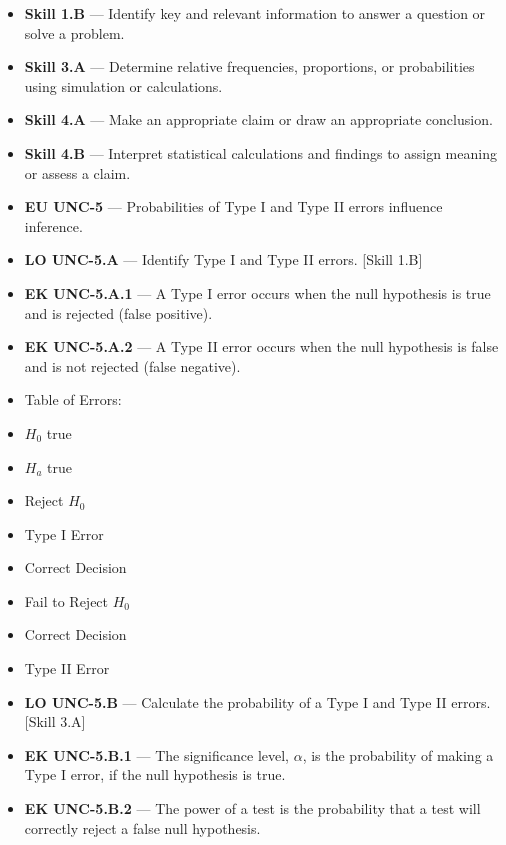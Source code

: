\documentclass[11pt]{article}
\begin{document}


{\small
\begin{itemize}[leftmargin=1.5em,itemsep=2pt,topsep=2pt]
  \item \textbf{Skill 1.B} --- Identify key and relevant information to answer a question or solve a problem.
  \item \textbf{Skill 3.A} --- Determine relative frequencies, proportions, or probabilities using simulation or calculations.
  \item \textbf{Skill 4.A} --- Make an appropriate claim or draw an appropriate conclusion.
  \item \textbf{Skill 4.B} --- Interpret statistical calculations and findings to assign meaning or assess a claim.
  \item \textbf{EU UNC-5} --- Probabilities of Type I and Type II errors influence inference.
  \item \textbf{LO UNC-5.A} --- Identify Type I and Type II errors. [Skill 1.B]
  \item \textbf{EK UNC-5.A.1} --- A Type I error occurs when the null hypothesis is true and is rejected (false positive).
  \item \textbf{EK UNC-5.A.2} --- A Type II error occurs when the null hypothesis is false and is not rejected (false negative).
  \item Table of Errors:
  \item $H_0$ true
  \item $H_a$ true
  \item Reject $H_0$
  \item Type I Error
  \item Correct Decision
  \item Fail to Reject $H_0$
  \item Correct Decision
  \item Type II Error
  \item \textbf{LO UNC-5.B} --- Calculate the probability of a Type I and Type II errors. [Skill 3.A]
  \item \textbf{EK UNC-5.B.1} --- The significance level, $\alpha$, is the probability of making a Type I error, if the null hypothesis is true.
  \item \textbf{EK UNC-5.B.2} --- The power of a test is the probability that a test will correctly reject a false null hypothesis.

\end{itemize}}
\end{document}
